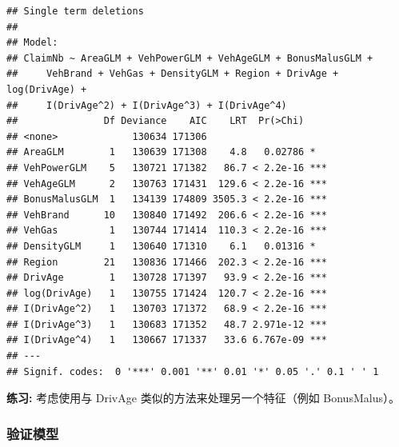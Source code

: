 \documentclass[
]{article}
\newenvironment{Shaded}{\begin{snugshade}}{\end{snugshade}}
\newcommand{\AttributeTok}[1]{\textcolor[rgb]{0.13,0.29,0.53}{#1}}
\newcommand{\CommentTok}[1]{\textcolor[rgb]{0.56,0.35,0.01}{\textit{#1}}}
\newcommand{\FunctionTok}[1]{\textcolor[rgb]{0.13,0.29,0.53}{\textbf{#1}}}
\newcommand{\NormalTok}[1]{#1}
\newcommand{\OtherTok}[1]{\textcolor[rgb]{0.56,0.35,0.01}{#1}}
\newcommand{\SpecialCharTok}[1]{\textcolor[rgb]{0.81,0.36,0.00}{\textbf{#1}}}
\newcommand{\StringTok}[1]{\textcolor[rgb]{0.31,0.60,0.02}{#1}}
\begin{document}
\begin{verbatim}
## Single term deletions
## 
## Model:
## ClaimNb ~ AreaGLM + VehPowerGLM + VehAgeGLM + BonusMalusGLM + 
##     VehBrand + VehGas + DensityGLM + Region + DrivAge + log(DrivAge) + 
##     I(DrivAge^2) + I(DrivAge^3) + I(DrivAge^4)
##               Df Deviance    AIC    LRT  Pr(>Chi)    
## <none>             130634 171306                     
## AreaGLM        1   130639 171308    4.8   0.02786 *  
## VehPowerGLM    5   130721 171382   86.7 < 2.2e-16 ***
## VehAgeGLM      2   130763 171431  129.6 < 2.2e-16 ***
## BonusMalusGLM  1   134139 174809 3505.3 < 2.2e-16 ***
## VehBrand      10   130840 171492  206.6 < 2.2e-16 ***
## VehGas         1   130744 171414  110.3 < 2.2e-16 ***
## DensityGLM     1   130640 171310    6.1   0.01316 *  
## Region        21   130836 171466  202.3 < 2.2e-16 ***
## DrivAge        1   130728 171397   93.9 < 2.2e-16 ***
## log(DrivAge)   1   130755 171424  120.7 < 2.2e-16 ***
## I(DrivAge^2)   1   130703 171372   68.9 < 2.2e-16 ***
## I(DrivAge^3)   1   130683 171352   48.7 2.971e-12 ***
## I(DrivAge^4)   1   130667 171337   33.6 6.767e-09 ***
## ---
## Signif. codes:  0 '***' 0.001 '**' 0.01 '*' 0.05 '.' 0.1 ' ' 1
\end{verbatim}

\textbf{练习:} 考虑使用与 DrivAge 类似的方法来处理另一个特征（例如
BonusMalus）。

\subsubsection{验证模型}\label{ux9a8cux8bc1ux6a21ux578b}

\begin{Shaded}
\end{Shaded}

\begin{Shaded}
\end{Shaded}
\end{document}
